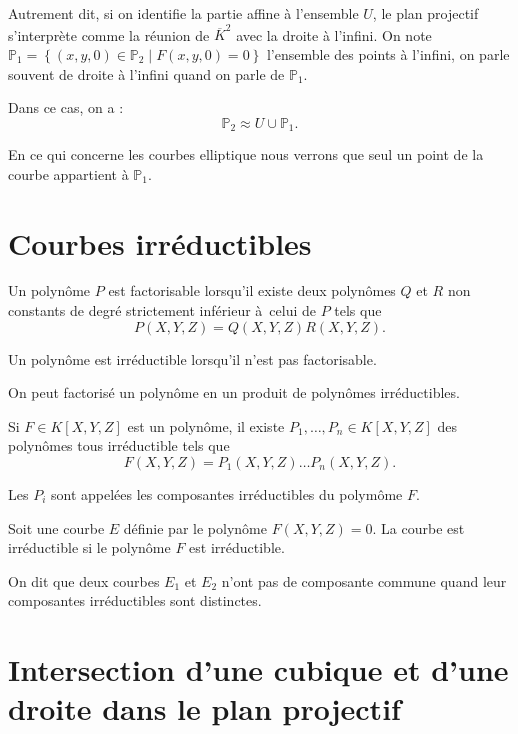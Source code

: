 Autrement dit, si on identifie la partie affine à l'ensemble $U$, le plan projectif s'interprète comme la
réunion de $\overline{K}^2$ avec la droite à l'infini.
On note $\mathbb{P}_{1} = \left\{ (x,y,0) \in \mathbb{P}_{2} \mid F(x,y,0) = 0 \right\} $
l'ensemble des points à l'infini, on parle souvent de droite à l'infini quand on parle de
$\mathbb{P}_{1}$.

Dans ce cas, on a :
\[
\mathbb{P}_{2} \approx U \cup \mathbb{P}_{1}
.\] 


\begin{remarque}
    En ce qui concerne les courbes elliptique nous verrons que seul un point de la courbe
    appartient à $\mathbb{P}_{1}$.
\end{remarque}

\section{Courbes irréductibles}

\begin{definition}
    \label{def:polyIrr}
    Un polynôme $P$ est factorisable lorsqu'il existe deux polynômes $Q$ et $R$ non
    constants de degré strictement inférieur à celui de $P$ tels que
    \[
    P(X,Y,Z) = Q(X,Y,Z)R(X,Y,Z)
    .\] 

    Un polynôme est irréductible lorsqu'il n'est pas factorisable.

    On peut factorisé un polynôme en un produit de polynômes irréductibles. 

    Si $F
    \in K[X,Y,Z]$ est un polynôme, il existe $P_1,\ldots,P_{n} \in K[X,Y,Z]$ des polynômes
    tous
    irréductible tels que
    \[
    F(X,Y,Z)= P_1(X,Y,Z)\ldots P_{n}(X,Y,Z)
    .\] 

    Les $P_{i}$ sont appelées les composantes irréductibles du polymôme $F$.
\end{definition}

\begin{definition}
    \label{def:courbeIrr}
    
    Soit une courbe $E$ définie par le polynôme $F(X,Y,Z) = 0$. La courbe est irréductible si
    le polynôme $F$ est irréductible.
\end{definition}

On dit que deux courbes $E_1$ et $E_2$ n'ont pas de composante commune quand leur
composantes irréductibles sont distinctes.

\section{Intersection d'une cubique et d'une droite dans le plan projectif}

